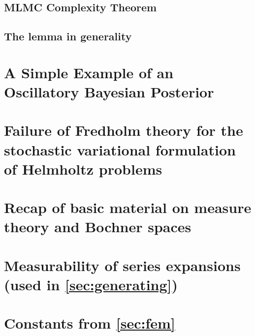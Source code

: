 \documentclass{report}
\begin{document}
\section{MLMC Complexity Theorem}\label{sec:comp}



\section{The lemma in generality}



\appendix

\chapter{A Simple Example of an Oscillatory Bayesian Posterior}\label{app:osc}


\chapter{Failure of Fredholm theory for the stochastic variational formulation of Helmholtz problems}\label{sec:federico}
 	

\chapter{Recap of basic material on measure theory and Bochner spaces}\label{app:mtBs}


\chapter{Measurability of series expansions (used in \cref{sec:generating})}\label{app:meas}


\chapter{Constants from \cref{sec:fem}}\label{app:constants}




\end{document}
